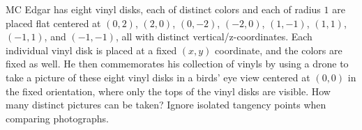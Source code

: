 MC Edgar has eight vinyl disks, each of distinct colors and each of radius $1$ are placed flat centered  at $(0, 2)$, $(2, 0)$, $(0, -2)$, $(-2, 0)$, $(1, -1)$, $(1, 1)$, $(-1, 1)$, and $(-1, -1)$, all with distinct vertical/z-coordinates. Each individual vinyl disk is placed at a fixed $(x, y)$ coordinate, and the colors are fixed as well. He then commemorates his collection of vinyls by using a drone to take a picture of these eight vinyl disks in a birds' eye view centered at $(0,0)$ in the fixed orientation, where only the tops of the vinyl disks are visible. How many distinct pictures can be taken? Ignore isolated tangency points when comparing photographs.
